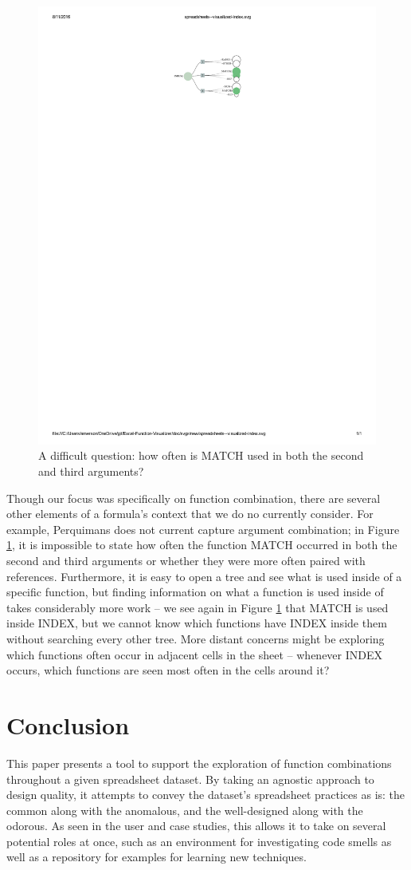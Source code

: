\documentclass[conference]{IEEEtran}
\newcommand{\toolname}{Perquimans\xspace} \newcommand{\toolnameend}{Perquimans}
\begin{document}
	\begin{figure} \centering \includegraphics[width=.4\textwidth]{index}
		\caption{A difficult question: how often is MATCH used in both the second and
			third arguments?} \label{fig:index} \end{figure}
	
	Though our focus was specifically on function combination, there are several
	other elements of a formula's context that we do no currently consider. For
	example, \toolname does not current capture argument combination; in Figure
	\ref{fig:index}, it is impossible to state how often the function MATCH
	occurred in both the second and third arguments or whether they were more often
	paired with references. Furthermore, it is easy to open a tree and see what is
	used inside of a specific function, but finding information on what a function
	is used inside of takes considerably more work -- we see again in Figure
	\ref{fig:index} that MATCH is used inside INDEX, but we cannot know which
	functions have INDEX inside them without searching every other tree. More
	distant concerns might be exploring which functions often occur in adjacent
	cells in the sheet -- whenever INDEX occurs, which functions are seen most
	often in the cells around it?
	
	\section{Conclusion}
	
	This paper presents a tool to support the exploration of function combinations
	throughout a given spreadsheet dataset. By taking an agnostic approach to
	design quality, it attempts to convey the dataset's spreadsheet practices as
	is: the common along with the anomalous, and the well-designed along with the
	odorous. As seen in the user and case studies, this allows it to take on
	several potential roles at once, such as an environment for investigating code
	smells as well as a repository for examples for learning new techniques.
	
\end{document}
